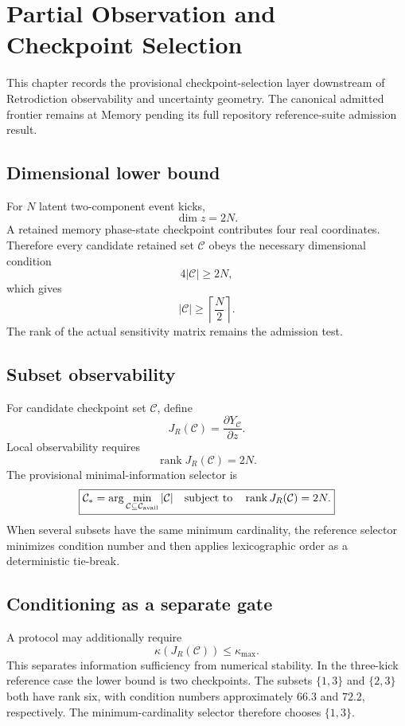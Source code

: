 \documentclass[11pt]{book}
\begin{document}
\chapter{Partial Observation and Checkpoint Selection}

This chapter records the provisional checkpoint-selection layer downstream of Retrodiction observability and uncertainty geometry. The canonical admitted frontier remains at Memory pending its full repository reference-suite admission result.

\section{Dimensional lower bound}

For \(N\) latent two-component event kicks,
\[
\dim z=2N.
\]
A retained memory phase-state checkpoint contributes four real coordinates. Therefore every candidate retained set \(\mathcal C\) obeys the necessary dimensional condition
\[
4|\mathcal C|\ge2N,
\]
which gives
\[
\boxed{
|\mathcal C|\ge\left\lceil\frac{N}{2}\right\rceil.
}
\]
The rank of the actual sensitivity matrix remains the admission test.

\section{Subset observability}

For candidate checkpoint set \(\mathcal C\), define
\[
J_R(\mathcal C)
=\frac{\partial Y_{\mathcal C}}{\partial z}.
\]
Local observability requires
\[
\boxed{
\operatorname{rank}J_R(\mathcal C)=2N.
}
\]
The provisional minimal-information selector is
\[
\boxed{
\mathcal C_*
=\arg\min_{\mathcal C\subseteq\mathcal C_{\rm avail}}
|\mathcal C|
\quad\text{subject to}\quad
\operatorname{rank}J_R(\mathcal C)=2N.
}
\]
When several subsets have the same minimum cardinality, the reference selector minimizes condition number and then applies lexicographic order as a deterministic tie-break.

\section{Conditioning as a separate gate}

A protocol may additionally require
\[
\boxed{
\kappa\!\left(J_R(\mathcal C)\right)\le\kappa_{\max}.
}
\]
This separates information sufficiency from numerical stability. In the three-kick reference case the lower bound is two checkpoints. The subsets \(\{1,3\}\) and \(\{2,3\}\) both have rank six, with condition numbers approximately \(66.3\) and \(72.2\), respectively. The minimum-cardinality selector therefore chooses \(\{1,3\}\).
\end{document}
